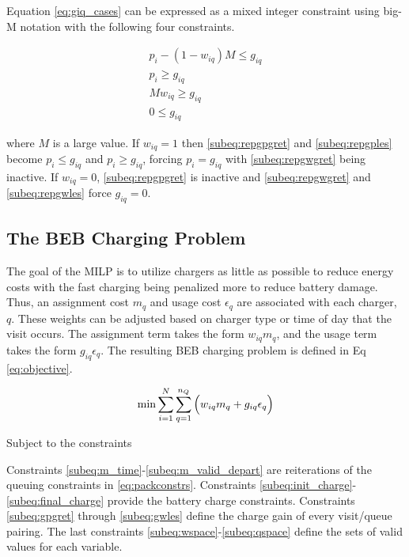 \documentclass[utf8]{FrontiersinHarvard}
\begin{document}
Equation \eqref{eq:giq_cases} can be expressed as a mixed integer constraint using big-M notation with the following
four constraints.

\begin{subequations}
    \label{eq:slack_gain}
\begin{align}
    p_i - (1 - w_{iq})M \leq g_{iq}  \label{subeq:repgpgret} \\
    p_i \geq g_{iq}                 \label{subeq:repgples} \\
    Mw_{iq} \geq g_{iq}              \label{subeq:repgwgret} \\
    0 \leq g_{iq}                   \label{subeq:repgwles}
\end{align}
\end{subequations}

\noindent
where $M$ is a large value. If $w_{iq} = 1$ then \eqref{subeq:repgpgret} and \eqref{subeq:repgples} become $p_i \leq
g_{iq}$ and $p_i \geq g_{iq}$, forcing $p_i = g_{iq}$ with \eqref{subeq:repgwgret} being inactive. If $w_{iq} =
0$, \eqref{subeq:repgpgret} is inactive and \eqref{subeq:repgwgret} and \eqref{subeq:repgwles} force $g_{iq} = 0$.

\subsection{The BEB Charging Problem} \label{sec:BEB_MILP}
The goal of the MILP is to utilize chargers as little as possible to reduce energy costs with the fast charging being
penalized more to reduce battery damage. Thus, an assignment cost $m_q$ and usage cost $\epsilon_q$ are associated with each
charger, $q$. These weights can be adjusted based on charger type or time of day that the visit occurs.
The assignment term takes the form $w_{iq}m_q$, and the usage term takes the form $g_{iq} \epsilon_q$. The resulting
BEB charging problem is defined in Eq \ref{eq:objective}.

\begin{equation}
\label{eq:objective}
	\min \sum_{i=1}^N \sum_{q=1}^{n_Q} \Big( w_{iq} m_q + g_{iq} \epsilon_q \Big) \\
\end{equation}

Subject to the constraints



Constraints \eqref{subeq:m_time}-\eqref{subeq:m_valid_depart} are reiterations of the queuing constraints in
\eqref{eq:packconstrs}. Constraints \eqref{subeq:init_charge}-\eqref{subeq:final_charge} provide the battery charge constraints.
Constraints \eqref{subeq:gpgret} through \eqref{subeq:gwles} define the charge gain of every visit/queue pairing.
The last constraints \eqref{subeq:wspace}-\eqref{subeq:qspace} define the sets of valid values for each variable.
\end{document}

